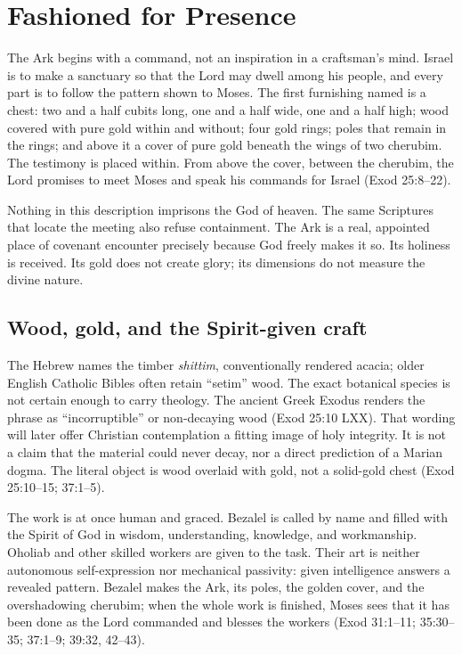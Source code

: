 \section{Fashioned for Presence}

The Ark begins with a command, not an inspiration in a craftsman's mind.
Israel is to make a sanctuary so that the Lord may dwell among his people, and
every part is to follow the pattern shown to Moses.  The first furnishing named
is a chest: two and a half cubits long, one and a half wide, one and a half
high; wood covered with pure gold within and without; four gold rings; poles
that remain in the rings; and above it a cover of pure gold beneath the wings
of two cherubim.  The testimony is placed within.  From above the cover,
between the cherubim, the Lord promises to meet Moses and speak his commands
for Israel (Exod 25:8--22).

Nothing in this description imprisons the God of heaven.  The same Scriptures
that locate the meeting also refuse containment.  The Ark is a real, appointed
place of covenant encounter precisely because God freely makes it so.  Its
holiness is received.  Its gold does not create glory; its dimensions do not
measure the divine nature.

\subsection{Wood, gold, and the Spirit-given craft}

The Hebrew names the timber \emph{shittim}, conventionally rendered acacia;
older English Catholic Bibles often retain ``setim'' wood.  The exact botanical
species is not certain enough to carry theology.  The ancient Greek Exodus
renders the phrase as ``incorruptible'' or non-decaying wood
(Exod 25:10 LXX).  That wording will later offer Christian contemplation a
fitting image of holy integrity.  It is not a claim that the material could
never decay, nor a direct prediction of a Marian dogma.  The literal object is
wood overlaid with gold, not a solid-gold chest (Exod 25:10--15; 37:1--5).

The work is at once human and graced.  Bezalel is called by name and filled
with the Spirit of God in wisdom, understanding, knowledge, and workmanship.
Oholiab and other skilled workers are given to the task.  Their art is neither
autonomous self-expression nor mechanical passivity: given intelligence
answers a revealed pattern.  Bezalel makes the Ark, its poles, the golden
cover, and the overshadowing cherubim; when the whole work is finished, Moses
sees that it has been done as the Lord commanded and blesses the workers
(Exod 31:1--11; 35:30--35; 37:1--9; 39:32, 42--43).

